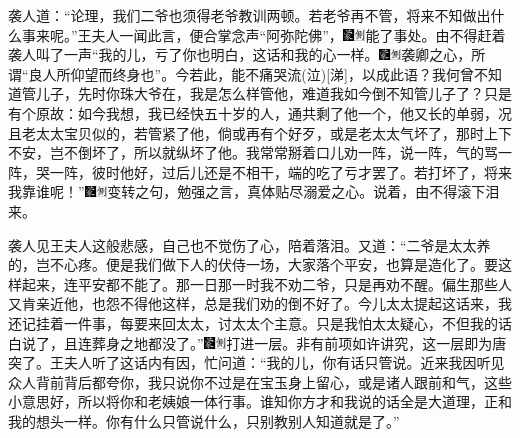 袭人道：“论理，我们二爷也须得老爷教训两顿。若老爷再不管，将来不知做出什么事来呢。”王夫人一闻此言，便合掌念声“阿弥陀佛”，{\includegraphics[width=3mm]{../Images/00006}\includegraphics[width=3mm]{../Images/00011}\footnotesize \kaishu 能了事处。}由不得赶着袭人叫了一声“我的儿，亏了你也明白，这话和我的心一样。{\includegraphics[width=3mm]{../Images/00006}\includegraphics[width=3mm]{../Images/00011}\footnotesize \kaishu 袭卿之心，所谓“良人所仰望而终身也”。今若此，能不痛哭流{(泣)}{[}涕{]}，以成此语？}我何曾不知道管儿子，先时你珠大爷在，我是怎么样管他，难道我如今倒不知管儿子了？只是有个原故：如今我想，我已经快五十岁的人，通共剩了他一个，他又长的单弱，况且老太太宝贝似的，若管紧了他，倘或再有个好歹，或是老太太气坏了，那时上下不安，岂不倒坏了，所以就纵坏了他。我常常掰着口儿劝一阵，说一阵，气的骂一阵，哭一阵，彼时他好，过后儿还是不相干，端的吃了亏才罢了。若打坏了，将来我靠谁呢！”{\includegraphics[width=3mm]{../Images/00006}\includegraphics[width=3mm]{../Images/00011}\footnotesize \kaishu 变转之句，勉强之言，真体贴尽溺爱之心。}说着，由不得滚下泪来。

袭人见王夫人这般悲感，自己也不觉伤了心，陪着落泪。又道：“二爷是太太养的，岂不心疼。便是我们做下人的伏侍一场，大家落个平安，也算是造化了。要这样起来，连平安都不能了。那一日那一时我不劝二爷，只是再劝不醒。偏生那些人又肯亲近他，也怨不得他这样，总是我们劝的倒不好了。今儿太太提起这话来，我还记挂着一件事，每要来回太太，讨太太个主意。只是我怕太太疑心，不但我的话白说了，且连葬身之地都没了。”{\includegraphics[width=3mm]{../Images/00006}\includegraphics[width=3mm]{../Images/00011}\footnotesize \kaishu 打进一层。非有前项如许讲究，这一层即为唐突了。}王夫人听了这话内有因，忙问道：“我的儿，你有话只管说。近来我因听见众人背前背后都夸你，我只说你不过是在宝玉身上留心，或是诸人跟前和气，这些小意思好，所以将你和老姨娘一体行事。谁知你方才和我说的话全是大道理，正和我的想头一样。你有什么只管说什么，只别教别人知道就是了。”

